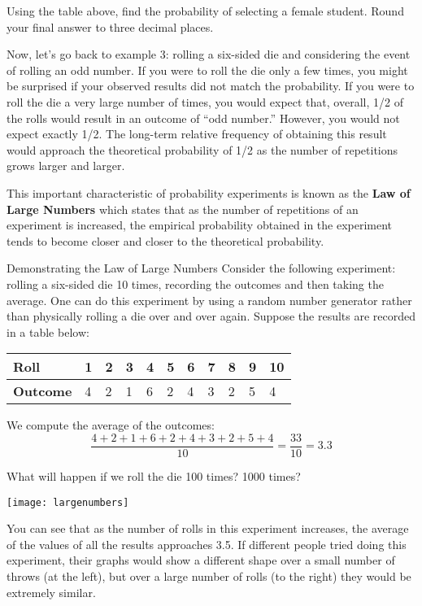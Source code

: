 \begin{try}
Using the table above, find the probability of selecting a female student. Round your final answer to three decimal places.
\end{try}  
\vfill
\pagebreak

Now, let's go back to example 3: rolling a six-sided die and considering the event of rolling an odd number. If you were to roll the die only a few times, you might be
surprised if your observed results did not match the probability. If you were to roll the die a very large number of times, you
would expect that, overall, 1/2 of the rolls would result in an outcome of ``odd number.''  However, you would not expect exactly 1/2.  The long-term relative frequency of obtaining this result would approach the theoretical probability of 1/2 as the number of repetitions grows larger and larger. 

This important characteristic of probability experiments is known as the \textbf{Law of Large Numbers} which states that as the number of repetitions of an experiment is increased, the empirical probability obtained in the experiment tends to become closer and closer to the theoretical probability.

\begin{example}[https://www.youtube.com/watch?v=UbKc9wadf64]{Demonstrating the Law of Large Numbers}
Consider the following experiment: rolling a six-sided die 10 times, recording the outcomes and then taking the average. One can do this experiment by using a random number generator rather than physically rolling a die over and over again. Suppose the results are recorded in a table below: \\

\begin{center}
\begin{tabular}{l | l l l l l l l l l l}
\textbf{Roll} & 1 & 2 & 3 & 4 & 5 & 6 & 7 & 8 & 9 & 10 \\ \hline
\textbf{Outcome} & 4 & 2 & 1 & 6 & 2 & 4 & 3 & 2 & 5 & 4
\end{tabular}
\end{center}
We compute the average of the outcomes: 
\[  \dfrac{ 4 + 2 + 1 + 6 + 2 + 4 + 3 + 2 + 5 + 4}{10} = \frac{33}{10} = 3.3 \]

What will happen if we roll the die 100 times? 1000 times? 

\begin{center}
\texttt{[image: largenumbers]}
\end{center}
You can see that as the number of rolls in this experiment increases, the average of the values of all the results approaches 3.5. If different people tried doing this experiment, their graphs would show a different shape over a small number of throws (at the left), but over a large number of rolls (to the right) they would be extremely similar.
\end{example}



